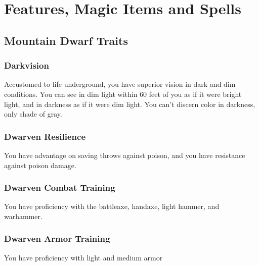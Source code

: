 \documentclass[letterpaper,openany,oneside,twocolumn]{book}
\begin{document}
\onecolumn


\rendercharactersheet

\renderbackgroundsheet

\renderspellsheet


\CantripSlotA{}
\CantripSlotB{}

\FirstLevelSpellSlotA{}
\FirstLevelSpellSlotB{}

\renderspellsheet


\restoregeometry
\twocolumn

\chapter*{Features, Magic Items and Spells}

\section*{Mountain Dwarf Traits}
\subsection*{Darkvision}
Accustomed to life underground, you have superior vision in dark and dim conditions. You can see in dim light within 60 feet of you as if it were bright light, and in darkness as if it were dim light. You can't discern color in darkness, only shade of gray.
\subsection*{Dwarven Resilience}
You have advantage on saving throws against poison, and you have resistance against poison damage.
\subsection*{Dwarven Combat Training}
You have proficiency with the battleaxe, handaxe, light hammer, and warhammer.
\subsection*{Dwarven Armor Training}
You have proficiency with light and medium armor
\end{document}
